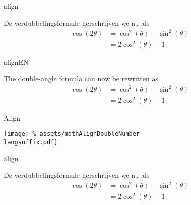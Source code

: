 
\begin{saveblock}{align}
    \begin{highlightblock}[gobble=8,linewidth=\textwidth,
        framexleftmargin=0.25em,xleftmargin=0.25em]
        De verdubbelingsformule herschrijven we nu als
        \begin{align}
            \cos(2\theta) &= \cos^2(\theta) - \sin^2(\theta)\\
            &= 2\cos^2(\theta)-1.
        \end{align}
    \end{highlightblock}
\end{saveblock}

\begin{saveblock}{alignEN}
    \begin{highlightblock}[gobble=8,linewidth=\textwidth,
        framexleftmargin=0.25em,xleftmargin=0.25em]
        The double-angle formula can now be rewritten as
        \begin{align}
            \cos(2\theta) &= \cos^2(\theta) - \sin^2(\theta)\\
            &= 2\cos^2(\theta)-1.
        \end{align}
    \end{highlightblock}
\end{saveblock}

\begin{frame}{Align}

    \texttt{[image: \%
        assets/mathAlignDoubleNumber\\langsuffix.pdf]}
\end{frame}


\unless\ifskipNonumber
    \begin{saveblock}{align}
        \begin{highlightblock}[gobble=12,linewidth=\textwidth,
            framexleftmargin=0.25em,xleftmargin=0.25em]
            De verdubbelingsformule herschrijven we nu als
            \begin{align}
                \cos(2\theta) &= \cos^2(\theta) - \sin^2(\theta)
                \nonumber\\
                &= 2\cos^2(\theta)-1.
            \end{align}
        \end{highlightblock}
    \end{saveblock}


